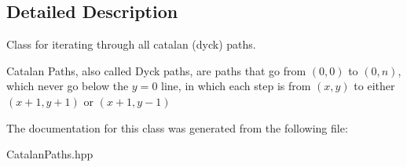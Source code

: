 \subsection{Detailed Description}
Class for iterating through all catalan (dyck) paths. 

Catalan Paths, also called Dyck paths, are paths that go from $(0,0)$ to $(0,n)$, which never go below the $ y=0$ line, in which each step is from $(x,y)$ to either $(x+1,y+1)$ or $(x+1,y-1)$ 

The documentation for this class was generated from the following file\-:\begin{DoxyCompactItemize}
\item 
Catalan\-Paths.\-hpp\end{DoxyCompactItemize}
